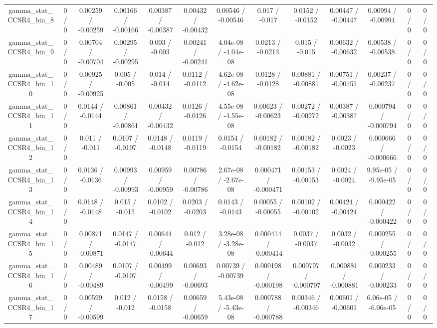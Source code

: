 \documentclass[10pt]{article}
\begin{document}
\begin{table}[htbp]
\begin{center}
\begin{tabular}{|c|c|c|c|c|c|c|c|c|c|c|c|c|}
  gamma_stat_CCSR4_bin_8 & 0 / 0 & 0.00259 / -0.00259 & 0.00166 / -0.00166 & 0.00387 / -0.00387 & 0.00432 / -0.00432 & 0.00546 / -0.00546 & 0.017 / -0.017 & 0.0152 / -0.0152 & 0.00447 / -0.00447 & 0.00994 / -0.00994 & 0 / 0 & 0 / 0 \\ 
  gamma_stat_CCSR4_bin_9 & 0 / 0 & 0.00704 / -0.00704 & 0.00295 / -0.00295 & 0.003 / -0.003 & 0.00241 / -0.00241 & 4.04e-08 / -4.04e-08 & 0.0213 / -0.0213 & 0.015 / -0.015 & 0.00632 / -0.00632 & 0.00538 / -0.00538 & 0 / 0 & 0 / 0 \\ 
  gamma_stat_CCSR4_bin_10 & 0 / 0 & 0.00925 / -0.00925 & 0.005 / -0.005 & 0.014 / -0.014 & 0.0112 / -0.0112 & 4.62e-08 / -4.62e-08 & 0.0128 / -0.0128 & 0.00881 / -0.00881 & 0.00751 / -0.00751 & 0.00237 / -0.00237 & 0 / 0 & 0 / 0 \\ 
  gamma_stat_CCSR4_bin_11 & 0 / 0 & 0.0144 / -0.0144 & 0.00861 / -0.00861 & 0.00432 / -0.00432 & 0.0126 / -0.0126 & 4.55e-08 / -4.55e-08 & 0.00623 / -0.00623 & 0.00272 / -0.00272 & 0.00387 / -0.00387 & 0.000794 / -0.000794 & 0 / 0 & 0 / 0 \\ 
  gamma_stat_CCSR4_bin_12 & 0 / 0 & 0.011 / -0.011 & 0.0107 / -0.0107 & 0.0148 / -0.0148 & 0.0119 / -0.0119 & 0.0154 / -0.0154 & 0.00182 / -0.00182 & 0.00182 / -0.00182 & 0.0023 / -0.0023 & 0.000666 / -0.000666 & 0 / 0 & 0 / 0 \\ 
  gamma_stat_CCSR4_bin_13 & 0 / 0 & 0.0136 / -0.0136 & 0.00993 / -0.00993 & 0.00959 / -0.00959 & 0.00786 / -0.00786 & 2.67e-08 / -2.67e-08 & 0.000471 / -0.000471 & 0.00153 / -0.00153 & 0.0024 / -0.0024 & 9.95e-05 / -9.95e-05 & 0 / 0 & 0 / 0 \\ 
  gamma_stat_CCSR4_bin_14 & 0 / 0 & 0.0148 / -0.0148 & 0.015 / -0.015 & 0.0102 / -0.0102 & 0.0203 / -0.0203 & 0.0143 / -0.0143 & 0.00055 / -0.00055 & 0.00102 / -0.00102 & 0.00424 / -0.00424 & 0.000422 / -0.000422 & 0 / 0 & 0 / 0 \\ 
  gamma_stat_CCSR4_bin_15 & 0 / 0 & 0.00871 / -0.00871 & 0.0147 / -0.0147 & 0.00644 / -0.00644 & 0.012 / -0.012 & 3.28e-08 / -3.28e-08 & 0.000414 / -0.000414 & 0.0037 / -0.0037 & 0.0032 / -0.0032 & 0.000255 / -0.000255 & 0 / 0 & 0 / 0 \\ 
  gamma_stat_CCSR4_bin_16 & 0 / 0 & 0.00489 / -0.00489 & 0.0107 / -0.0107 & 0.00499 / -0.00499 & 0.00693 / -0.00693 & 0.00739 / -0.00739 & 0.000198 / -0.000198 & 0.000797 / -0.000797 & 0.000881 / -0.000881 & 0.000233 / -0.000233 & 0 / 0 & 0 / 0 \\ 
  gamma_stat_CCSR4_bin_17 & 0 / 0 & 0.00599 / -0.00599 & 0.012 / -0.012 & 0.0158 / -0.0158 & 0.00659 / -0.00659 & 5.43e-08 / -5.43e-08 & 0.000788 / -0.000788 & 0.00346 / -0.00346 & 0.00601 / -0.00601 & 6.06e-05 / -6.06e-05 & 0 / 0 & 0 / 0 \\ 

\end{tabular}
\end{center}
\end{table}
\end{document}
